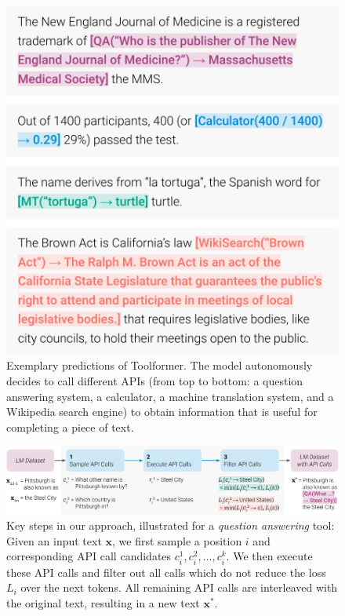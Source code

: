 \documentclass[11pt]{article}
\newcommand{\ours}[0]{Toolformer}
\begin{document}
\begin{CJK*}{UTF8}{gbsn}
\begin{figure}
    \centering
    \includegraphics[width=\linewidth]{figures/example.pdf}
    \caption{Exemplary predictions of \ours{}. The model autonomously decides to call different APIs (from top to bottom: a question answering system, a calculator, a machine translation system, and a Wikipedia search engine) to obtain information that is useful for completing a piece of text.}
    \label{fig:example}
\end{figure}

\begin{figure}
    \centering
    \includegraphics[width=\linewidth]{figures/approach.pdf}
    \caption{Key steps in our approach, illustrated for a \emph{question answering} tool: Given an input text $\mathbf{x}$, we first sample a position $i$ and corresponding API call candidates $c_i^1, c_i^2, \ldots, c_i^k$. We then execute these API calls and filter out all calls which do not reduce the loss $L_i$ over the next tokens. All remaining API calls are interleaved with the original text, resulting in a new text $\mathbf{x}^*$.}
    \label{fig:approach}
\end{figure}


\end{CJK*}
\end{document}
